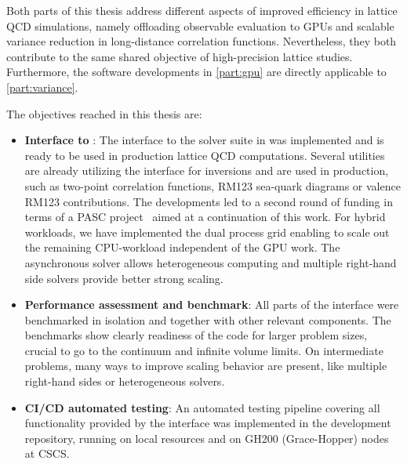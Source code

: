 
Both parts of this thesis address different aspects of improved efficiency in lattice QCD simulations, namely offloading observable evaluation to GPUs and scalable variance reduction in long-distance correlation functions.
Nevertheless, they both contribute to the same shared objective of high-precision lattice studies.
Furthermore, the software developments in \cref{part:gpu} are directly applicable to \cref{part:variance}.

The objectives reached in this thesis are: 
\begin{itemize}
   \item \textbf{Interface to \quda}: The interface to the solver suite in \quda was implemented and is ready to be used in production lattice QCD computations. Several utilities are already utilizing the interface for inversions and are used in production, such as two-point correlation functions, RM123 sea-quark diagrams or valence RM123 contributions. The developments led to a second round of funding in terms of a PASC project~\cite{online:pasc2025} aimed at a continuation of this work. For hybrid workloads, we have implemented the dual process grid enabling to scale out the remaining CPU-workload independent of the GPU work. The asynchronous solver allows heterogeneous computing and multiple right-hand side solvers provide better strong scaling.
   \item \textbf{Performance assessment and benchmark}: All parts of the interface were benchmarked in isolation and together with other relevant components. The benchmarks show clearly readiness of the code for larger problem sizes, crucial to go to the continuum and infinite volume limits. On intermediate problems, many ways to improve scaling behavior are present, like multiple right-hand sides or heterogeneous solvers.
   \item \textbf{CI/CD automated testing}: An automated testing pipeline covering all functionality provided by the interface was implemented in the development repository, running on local resources and on GH200 (Grace-Hopper) nodes at CSCS.

\end{itemize}
